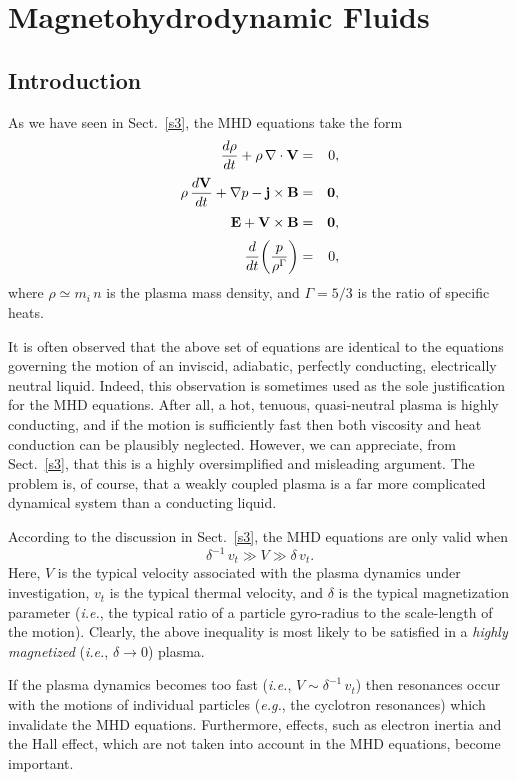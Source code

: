 \chapter {Magnetohydrodynamic Fluids}
\section{Introduction}
As we have seen in Sect.~\ref{s3}, the MHD equations take the form
\begin{eqnarray}\label{e5.1a}
\frac{d\rho}{dt} + \rho\,\nabla\cdot{\bf V} &=& 0,\\[0.5ex]\label{e5.1b}
\rho\,\frac{d{\bf V}}{dt} + \nabla p - {\bf j}\times {\bf B} &=& {\bf 0},\\[0.5ex]
{\bf E} + {\bf V} \times {\bf B} &=& {\bf 0},\\[0.5ex]
\frac{d}{dt}\!\left(\frac{p}{\rho^{\Gamma}}\right) &=& 0,\label{e5.1d}
\end{eqnarray}
where $\rho\simeq m_i\,n$ is the plasma mass density, and ${\Gamma}=5/3$ is the
ratio of specific heats. 

It is often observed that the above set of equations
are identical to the equations governing the motion of an inviscid, adiabatic,
perfectly conducting, electrically neutral
 liquid. Indeed, this observation is sometimes used as the
sole justification for the MHD equations. After all, a hot, tenuous, quasi-neutral
plasma is  highly conducting, and if the motion is sufficiently fast
then both viscosity and heat conduction can be plausibly neglected. However,
we can appreciate, from Sect.~\ref{s3}, that this is a highly 
oversimplified and misleading argument. The problem is, of course, that
a weakly coupled plasma is a far more complicated dynamical system than
a conducting liquid. 

According to the discussion in
Sect.~\ref{s3}, the MHD equations are only valid when
\begin{equation}
\delta^{-1}\,v_t \gg V \gg \delta\,v_t.
\end{equation}
Here, $V$ is the typical velocity associated with the plasma
dynamics  under investigation,
$v_t$ is the typical thermal velocity, and $\delta$ is the typical magnetization
parameter ({\em i.e.}, the typical ratio of a particle gyro-radius to
the scale-length of the motion). Clearly, the above inequality is
most likely to be satisfied in a {\em highly magnetized}\/ ({\em i.e.},
$\delta\rightarrow 0$) plasma. 

If the plasma dynamics  becomes too fast ({\em i.e.}, $V\sim \delta^{-1}\,v_t$)
then resonances occur with the motions of individual particles 
({\em e.g.}, the cyclotron resonances) which
invalidate the MHD equations. Furthermore, effects, such as electron
inertia and the Hall effect, which are not taken into account in the
MHD equations, become important. 

